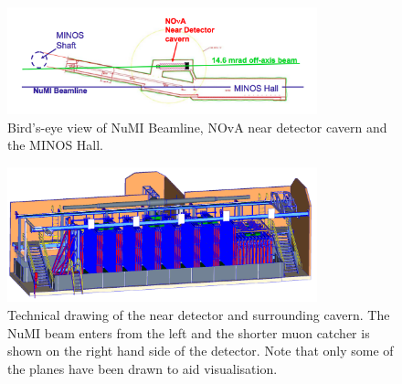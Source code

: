 \begin{figure}
  \centering
  \includegraphics[width=0.8\textwidth]{../../img/baird/det/neardet_cavern_diagram.png}
  \caption{Bird's-eye view of NuMI Beamline, NOvA near detector cavern
    and the MINOS Hall. }
  \label{fig:cavern}
\end{figure}

\begin{figure}
  \centering
  \includegraphics[width=0.8\textwidth]{../../img/baird/det/ND_01.png}
  \caption{Technical drawing of the near detector and surrounding
    cavern. The NuMI beam enters from the left and the shorter muon
    catcher is shown on the right hand side of the detector. Note that
    only some of the planes have been drawn to aid visualisation.}
  \label{fig:neardet}
\end{figure}







